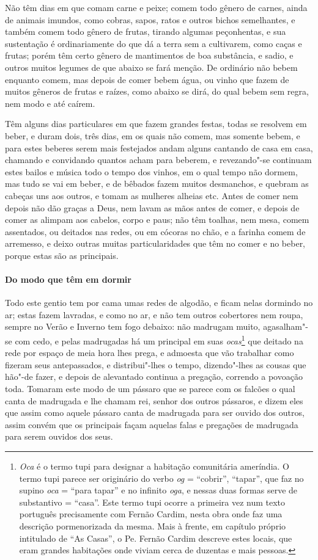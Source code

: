  Não têm dias em que comam carne e peixe; comem todo gênero de carnes,
ainda de animais imundos, como cobras, sapos, ratos e outros bichos
semelhantes, e também comem todo gênero de frutas, tirando algumas
peçonhentas, e sua sustentação é ordinariamente do que dá a terra sem
a cultivarem, como caças e frutas; porém têm certo gênero de
mantimentos de boa substância, e sadio, e outros muitos legumes de que
abaixo se fará menção. De ordinário não bebem enquanto comem, mas
depois de comer bebem água, ou vinho que fazem de muitos gêneros de
frutas e raízes, como abaixo se dirá, do qual bebem sem regra, nem modo
e até caírem.

 Têm alguns dias particulares em que fazem grandes festas, todas se
resolvem em beber, e duram dois, três dias, em os quais não comem, mas
somente bebem, e para estes beberes serem mais festejados andam alguns
cantando de casa em casa, chamando e convidando quantos acham para
beberem, e revezando"-se continuam estes bailos e música todo o tempo
dos vinhos, em o qual tempo não dormem, mas tudo se vai em beber, e de
bêbados fazem muitos desmanchos, e quebram as cabeças uns aos outros, e
tomam as mulheres alheias etc. Antes de comer nem depois não dão
graças a Deus, nem lavam as mãos antes de comer, e depois de comer as
alimpam aos cabelos, corpo e paus; não têm toalhas, nem mesa, comem
assentados, ou deitados nas redes, ou em cócoras no chão, e a farinha
comem de arremesso, e deixo outras muitas particularidades que têm no
comer e no beber, porque estas são as principais.

\paragraph{Do modo que têm em dormir} 

Todo este gentio tem por cama umas redes de algodão, e ficam
nelas dormindo no ar; estas fazem lavradas, e como no ar, e não tem
outros cobertores nem roupa, sempre no Verão e Inverno tem fogo
debaixo: não madrugam muito, agasalham"-se com cedo, e pelas madrugadas
há um principal em suas \textit{ocas}\footnote{ \textit{Oca} é o
termo tupi para designar a habitação comunitária ameríndia. O termo
tupi parece ser originário do verbo \textit{og} = ``cobrir'', ``tapar'',
que faz no supino \textit{oca} = ``para tapar'' e no infinito
\textit{oga}, e nessas duas formas serve de substantivo = ``casa''. 
Este termo tupi ocorre a primeira vez num texto português
precisamente com Fernão Cardim, nesta obra onde faz uma descrição
pormenorizada da mesma. Mais à frente, em capítulo próprio intitulado
de ``As Casas'', o Pe. Fernão Cardim descreve estes locais, que
eram grandes habitações onde viviam cerca de duzentas e mais pessoas.} 
que deitado na rede por espaço de meia hora lhes prega, e admoesta que
vão trabalhar como fizeram seus antepassados, e distribui"-lhes o tempo,
dizendo"-lhes as cousas que hão"-de fazer, e depois de alevantado
continua a pregação, correndo a povoação toda. Tomaram este modo de um
pássaro que se parece com os falcões o qual canta de madrugada e lhe
chamam rei, senhor dos outros pássaros, e dizem eles que assim como
aquele pássaro canta de madrugada para ser ouvido dos outros, assim
convém que os principais façam aquelas falas e pregações de madrugada
para serem ouvidos dos seus.

